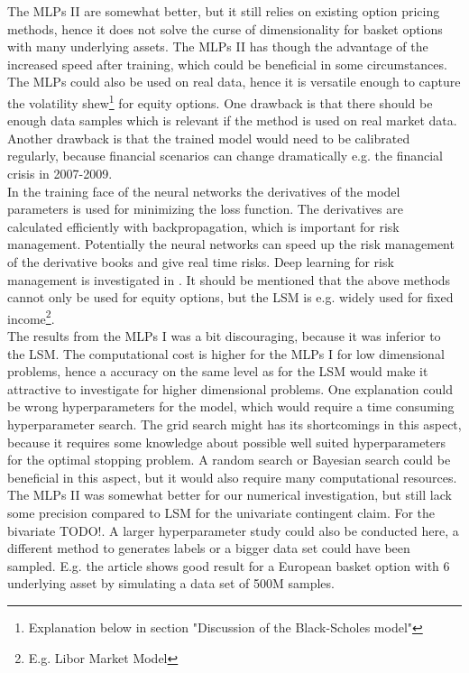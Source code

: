 The MLPs II are somewhat better, but it still relies on existing option pricing methods, hence it does not solve the curse of dimensionality for basket options with many underlying assets. The MLPs II has though the advantage of the increased speed after training, which could be beneficial in some circumstances. The MLPs could also be used on real data, hence it is versatile enough to capture the volatility shew\footnote{Explanation below in section "Discussion of the Black-Scholes model"} for equity options. One drawback is that there should be enough data samples which is relevant if the method is used on real market data. Another drawback is that the trained model would need to be calibrated regularly, because financial scenarios can change dramatically e.g. the financial crisis in 2007-2009.\\

In the training face of the neural networks the derivatives of the model parameters is used for minimizing the loss function. The derivatives are calculated efficiently with backpropagation, which is important for risk management. Potentially the neural networks can speed up the risk management of the derivative books and give real time risks. Deep learning for risk management is investigated in \parencite{AntoineSavine}. It should be mentioned that the above methods cannot only be used for equity options, but the LSM is e.g. widely used for fixed income\footnote{E.g. Libor Market Model}.\\

The results from the MLPs I was a bit discouraging, because it was inferior to the LSM. The computational cost is higher for the MLPs I for low dimensional problems, hence a accuracy on the same level as for the LSM would make it attractive to investigate for higher dimensional problems. One explanation could be wrong hyperparameters for the model, which would require a time consuming hyperparameter search. The grid search might has its shortcomings in this aspect, because it requires some knowledge about possible well suited hyperparameters for the optimal stopping problem. A random search or Bayesian search could be beneficial in this aspect, but it would also require many computational resources.\\

The MLPs II was somewhat better for our numerical investigation, but still lack some precision compared to LSM for the univariate contingent claim. For the bivariate TODO!. A larger hyperparameter study could also be conducted here, a different method to generates labels or a bigger data set could have been sampled. E.g. the article \parencite{FergusonRyan2018} shows good result for a European basket option with 6 underlying asset by simulating a data set of 500M samples. 

